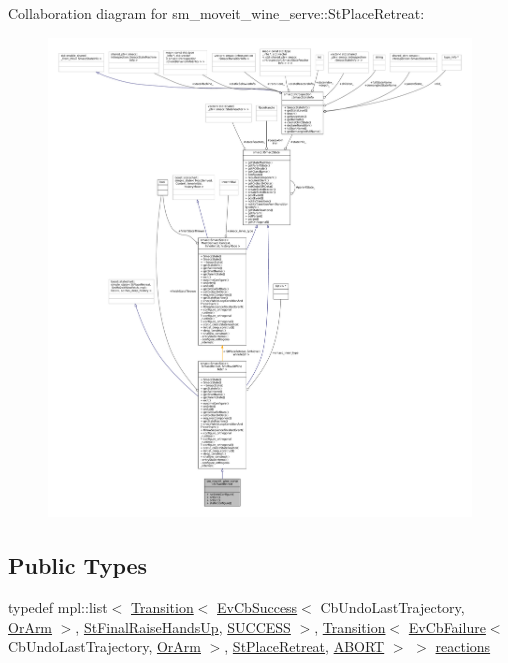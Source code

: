 Collaboration diagram for sm\+\_\+moveit\+\_\+wine\+\_\+serve\+:\+:St\+Place\+Retreat\+:
\nopagebreak
\begin{figure}[H]
\begin{center}
\leavevmode
\includegraphics[width=350pt]{structsm__moveit__wine__serve_1_1StPlaceRetreat__coll__graph}
\end{center}
\end{figure}
\subsection*{Public Types}
\begin{DoxyCompactItemize}
\item 
typedef mpl\+::list$<$ \hyperlink{classsmacc_1_1Transition}{Transition}$<$ \hyperlink{structsmacc_1_1EvCbSuccess}{Ev\+Cb\+Success}$<$ Cb\+Undo\+Last\+Trajectory, \hyperlink{classsm__moveit__wine__serve_1_1OrArm}{Or\+Arm} $>$, \hyperlink{structsm__moveit__wine__serve_1_1StFinalRaiseHandsUp}{St\+Final\+Raise\+Hands\+Up}, \hyperlink{structsmacc_1_1default__transition__tags_1_1SUCCESS}{S\+U\+C\+C\+E\+SS} $>$, \hyperlink{classsmacc_1_1Transition}{Transition}$<$ \hyperlink{structsmacc_1_1EvCbFailure}{Ev\+Cb\+Failure}$<$ Cb\+Undo\+Last\+Trajectory, \hyperlink{classsm__moveit__wine__serve_1_1OrArm}{Or\+Arm} $>$, \hyperlink{structsm__moveit__wine__serve_1_1StPlaceRetreat}{St\+Place\+Retreat}, \hyperlink{structsmacc_1_1default__transition__tags_1_1ABORT}{A\+B\+O\+RT} $>$ $>$ \hyperlink{structsm__moveit__wine__serve_1_1StPlaceRetreat_ad79f082a8f181baac1ca456c08b70b0f}{reactions}
\end{DoxyCompactItemize}
